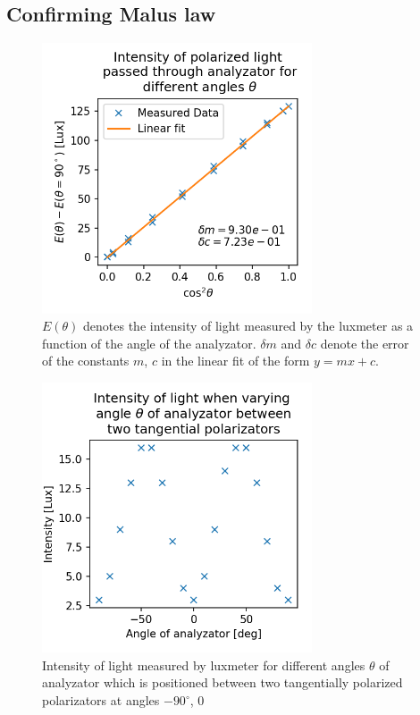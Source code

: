 \documentclass[11pt,a4paper]{article}
\begin{document}
  \subsection{Confirming Malus law}

  \begin{figure}[H]
    \center
    \includegraphics[width=8cm]{scripts/malus1.png}
    \caption{$E(\theta)$ denotes the intensity of light measured by the luxmeter as a function of the angle of the analyzator. $\delta m$ and $\delta c$ denote the error of the constants $m$, $c$ in the linear fit of the form $y=mx+c$.}
    \label{fig:malus1}
  \end{figure}

  \begin{figure}[H]
    \center
    \includegraphics[width=8cm]{scripts/malus2.png}
    \caption{Intensity of light measured by luxmeter for different angles $\theta$ of analyzator which is positioned between two tangentially polarized polarizators at angles $-90^\circ$, $0$}
    \label{fig:malus1}
  \end{figure}
\end{document}

